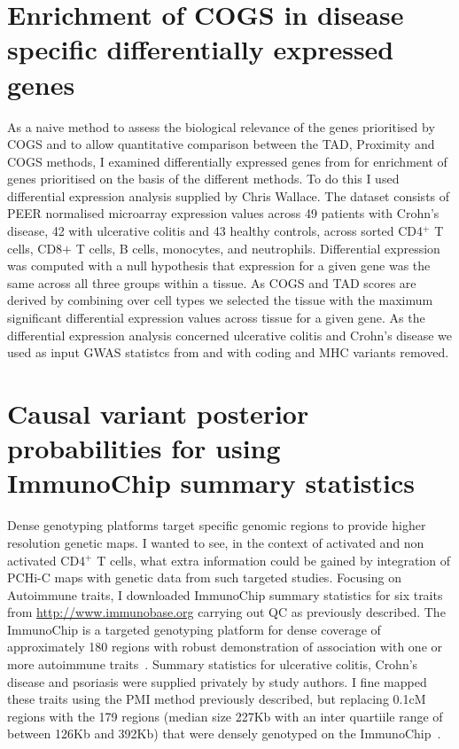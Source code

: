 \documentclass[a4paper,11pt]{report}
\begin{document}
\section{Enrichment of COGS in disease specific differentially expressed genes}
As a naive method to assess the biological relevance of the genes prioritised by COGS and to allow quantitative comparison between the TAD, Proximity and COGS methods, I examined  differentially expressed genes from \citet{PetersLyonsLeeEtAl2016} for enrichment of genes prioritised on the basis of the different methods. To do this I used differential expression analysis supplied by Chris Wallace. The dataset consists of PEER normalised microarray expression values across 49 patients with Crohn's disease, 42 with ulcerative colitis and 43 healthy controls, across sorted  CD4$^+$ T cells, CD8$+$ T cells, B cells, monocytes, and neutrophils. Differential expression was computed with a null hypothesis that expression for a given gene was the same across all three groups within a tissue. As COGS and TAD scores are derived by combining over cell types we selected the tissue with the maximum significant differential expression values across tissue for a given gene. As the differential expression analysis concerned ulcerative colitis and Crohn's disease we used as input GWAS statistcs from \citet{Anderson2011-ch} and \citet{Franke2010-mj} with coding and MHC variants removed.

\section{Causal variant posterior probabilities for using ImmunoChip summary statistics}
Dense genotyping platforms target specific genomic regions to provide higher resolution genetic maps. I wanted to see, in the context of activated and non activated CD4$^{+}$ T cells, what extra information could be gained by integration of PCHi-C maps with genetic data from such targeted studies.  Focusing on Autoimmune traits,  I downloaded  ImmunoChip summary statistics for six traits from \url{http://www.immunobase.org} carrying out QC as previously described. The ImmunoChip is a targeted genotyping platform for dense coverage of approximately 180 regions with robust demonstration of association with one or more autoimmune traits~\citep{CortesBrown2011}. Summary statistics for ulcerative colitis, Crohn's disease and psoriasis were supplied privately by study authors. I fine mapped these traits using the PMI method previously described, but replacing 0.1cM regions with the 179 regions (median size 227Kb with an inter quartiile range of between 126Kb and 392Kb) that were densely genotyped on the ImmunoChip~\citep{Onengut-Gumuscu2015-lb}. 
\end{document}
